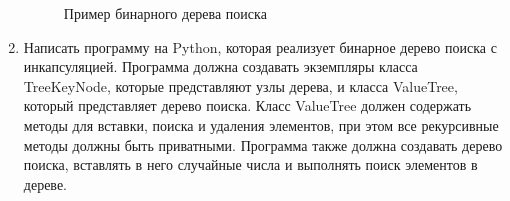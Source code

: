 \begin{enumerate}
\begin{figure}[h]
\centering
{}
\caption{Пример бинарного дерева поиска}
\end{figure}

\item Написать программу на Python, которая реализует бинарное дерево поиска с инкапсуляцией. Программа должна создавать экземпляры класса TreeKeyNode, которые представляют узлы дерева, и класса ValueTree, который представляет дерево поиска. Класс ValueTree должен содержать методы для вставки, поиска и удаления элементов, при этом все рекурсивные методы должны быть приватными. Программа также должна создавать дерево поиска, вставлять в него случайные числа и выполнять поиск элементов в дереве.


\end{enumerate}
